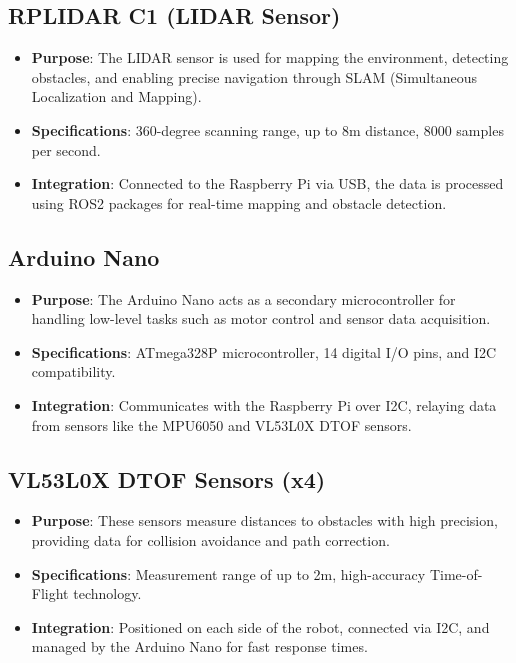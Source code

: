\documentclass[12pt,a4paper]{article}
\begin{document}
\subsection{RPLIDAR C1 (LIDAR Sensor)}
\begin{itemize}
    \item \textbf{Purpose}: The LIDAR sensor is used for mapping the environment, detecting obstacles, and enabling precise navigation through SLAM (Simultaneous Localization and Mapping).
    \item \textbf{Specifications}: 360-degree scanning range, up to 8m distance, 8000 samples per second.
    \item \textbf{Integration}: Connected to the Raspberry Pi via USB, the data is processed using ROS2 packages for real-time mapping and obstacle detection.
\end{itemize}

\subsection{Arduino Nano}
\begin{itemize}
    \item \textbf{Purpose}: The Arduino Nano acts as a secondary microcontroller for handling low-level tasks such as motor control and sensor data acquisition.
    \item \textbf{Specifications}: ATmega328P microcontroller, 14 digital I/O pins, and I2C compatibility.
    \item \textbf{Integration}: Communicates with the Raspberry Pi over I2C, relaying data from sensors like the MPU6050 and VL53L0X DTOF sensors.
\end{itemize}

\subsection{VL53L0X DTOF Sensors (x4)}
\begin{itemize}
    \item \textbf{Purpose}: These sensors measure distances to obstacles with high precision, providing data for collision avoidance and path correction.
    \item \textbf{Specifications}: Measurement range of up to 2m, high-accuracy Time-of-Flight technology.
    \item \textbf{Integration}: Positioned on each side of the robot, connected via I2C, and managed by the Arduino Nano for fast response times.
\end{itemize}
\end{document}
